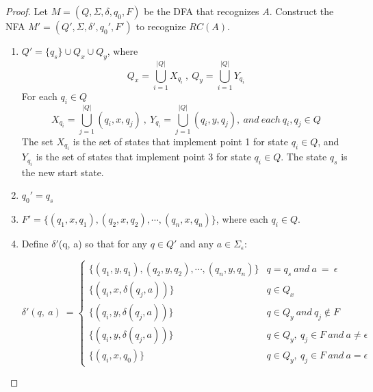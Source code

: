 \documentclass[11pt]{article}
\begin{document}
\begin{proof}
Let $M = (Q, \Sigma, \delta, q_{0}, F)$ be the DFA that recognizes $A$. Construct the NFA $M' = (Q', \Sigma, \delta', q_{0}', F')$ to recognize $RC(A)$.
\begin{enumerate}
\item $Q' = \{ q_{s} \} \cup Q_{x} \cup Q_{y}$, where
\[ 
Q_{x} = \bigcup_{i=1}^{|Q|}X_{q_{i}} \ , \ Q_{y} = \bigcup_{i=1}^{|Q|}Y_{q_{i}}
\]
For each $q_{i} \in Q$
\[ 
X_{q_{i}} = \bigcup_{j=1}^{|Q|}(q_{i}, x, q_{j}) \ , \ Y_{q_{i}} = \bigcup_{j=1}^{|Q|}(q_{i}, y, q_{j}), \ and \ each \ q_{i}, q_{j} \in Q
\]
The set $X_{q_{i}}$ is the set of states that implement point 1 for state $q_{i} \in Q$, and $Y_{q_{i}}$ is the set of states that implement point 3 for state $q_{i} \in Q$. The state $q_{s}$ is the new start state.
\item $q_{0}' = q_{s}$
\item $F' = \{ (q_{1}, x, q_{1}), (q_{2}, x, q_{2}), \cdots, (q_{n}, x, q_{n})  \}$, where each $q_{i} \in Q$.
\item Define $\delta'$(q, a) so that for any $q \in Q'$ and any $a \in \Sigma_{\epsilon}$:
\begin{center}
$\displaystyle \delta '( q,\ a) \ =\begin{cases}
\{(q_{1}, y, q_{1}), (q_{2}, y, q_{2}),\cdots,(q_{n}, y, q_{n})\} & q=q_{s} \ and\ a\ =\ \epsilon \\
\{(q_{i},x,\delta(q_{j},a))\}  & q \in Q_{x} \\
\{(q_{i},y,\delta(q_{j},a))\}  & q \in Q_{y} \ and \ q_{j} \notin F \\
\{(q_{i},y,\delta(q_{j},a))\}  & q \in Q_{y}, \ q_{j} \in F \ and \ a \neq \epsilon \\
\{(q_{i},x,q_{0})\}  & q \in Q_{y}, \ q_{j} \in F \ and \ a = \epsilon
\end{cases}$
\end{center}
\end{enumerate}
\end{proof}
\end{document}
